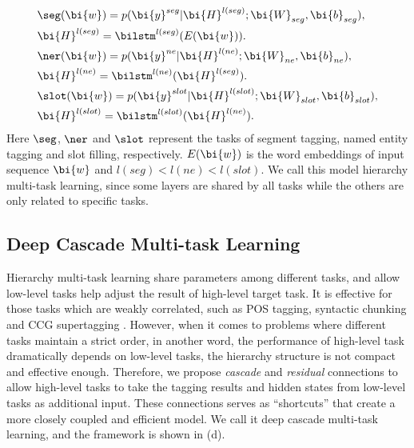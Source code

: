 \begin{eqnarray*}
	& \seg(\bi{w})=p(\bi{y}^{seg}|\bi{H}^{l(seg)};\bi{W}_{seg},\bi{b}_{seg}), \\
	& \bi{H}^{l(seg)}=\bilstm^{l(seg)}(E(\bi{w})). \\
	& \ner(\bi{w})=p(\bi{y}^{ne}|\bi{H}^{l(ne)};\bi{W}_{ne},\bi{b}_{ne}), \\
	& \bi{H}^{l(ne)}=\bilstm^{l(ne)}(\bi{H}^{l(seg)}).\\
	& \slot(\bi{w})=p(\bi{y}^{slot}|\bi{H}^{l(slot)};\bi{W}_{slot},\bi{b}_{slot}), \\
	& \bi{H}^{l(slot)}=\bilstm^{l(slot)}(\bi{H}^{l(ne)}).
\end{eqnarray*}
Here $\seg$, $\ner$ and $\slot$ represent the tasks of
segment tagging, named entity tagging and slot filling, respectively.
$E(\bi{w})$ is the word embeddings of input sequence $\bi{w}$ and 
$l(seg) < l(ne) < l(slot)$.
We call this model hierarchy multi-task learning,
since some layers are shared by all tasks 
while the others are only related to specific tasks.

\subsection{Deep Cascade Multi-task Learning}
\label{sec:dcmtl}
Hierarchy multi-task learning share parameters among different tasks,
and allow low-level tasks help adjust the result of high-level target task.
It is effective for those tasks which are weakly correlated,
such as POS tagging, syntactic chunking and CCG supertagging \cite{sogaard2016deep}.
However, when it comes to problems where different tasks maintain a 
strict order, in another word, the performance of high-level task 
dramatically depends on low-level tasks,
the hierarchy structure is not compact and effective enough.
Therefore, we propose \emph{cascade} and \emph{residual} connections
to allow high-level tasks to take the tagging results and hidden states 
from low-level tasks as additional input. 
These connections serves as ``shortcuts'' that 
create a more closely coupled and efficient model.
We call it deep cascade multi-task learning, 
and the framework is shown in (d).

